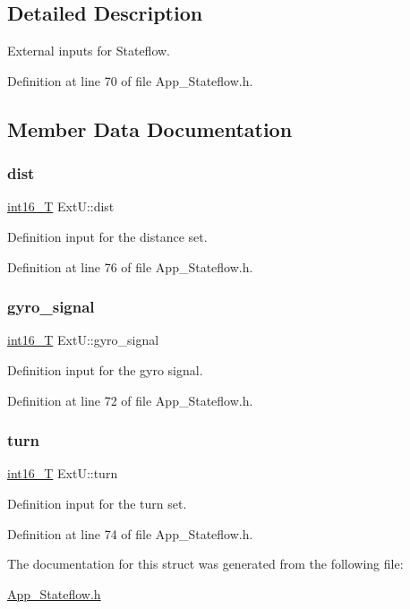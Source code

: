 \subsection{Detailed Description}
External inputs for Stateflow. 

Definition at line 70 of file App\+\_\+\+Stateflow.\+h.



\subsection{Member Data Documentation}
\mbox{\label{struct_ext_u_a6c69fa6ebe22e9a073888b6b9dce877d}} 
\subsubsection{\texorpdfstring{dist}{dist}}
{\footnotesize\ttfamily \mbox{\hyperlink{_app___stateflowtypes_8h_ad73c6af88bb2ce70799e51f639309f21}{int16\+\_\+T}} Ext\+U\+::dist}



Definition input for the distance set. 



Definition at line 76 of file App\+\_\+\+Stateflow.\+h.

\mbox{\label{struct_ext_u_a6c0a282afef47d6b37f84bc45769e69d}} 
\subsubsection{\texorpdfstring{gyro\+\_\+signal}{gyro\_signal}}
{\footnotesize\ttfamily \mbox{\hyperlink{_app___stateflowtypes_8h_ad73c6af88bb2ce70799e51f639309f21}{int16\+\_\+T}} Ext\+U\+::gyro\+\_\+signal}



Definition input for the gyro signal. 



Definition at line 72 of file App\+\_\+\+Stateflow.\+h.

\mbox{\label{struct_ext_u_a70e9fe496991f7c0e1fe8f54c5bf4c97}} 
\subsubsection{\texorpdfstring{turn}{turn}}
{\footnotesize\ttfamily \mbox{\hyperlink{_app___stateflowtypes_8h_ad73c6af88bb2ce70799e51f639309f21}{int16\+\_\+T}} Ext\+U\+::turn}



Definition input for the turn set. 



Definition at line 74 of file App\+\_\+\+Stateflow.\+h.



The documentation for this struct was generated from the following file\+:\begin{DoxyCompactItemize}
\item 
\mbox{\hyperlink{_app___stateflow_8h}{App\+\_\+\+Stateflow.\+h}}\end{DoxyCompactItemize}
